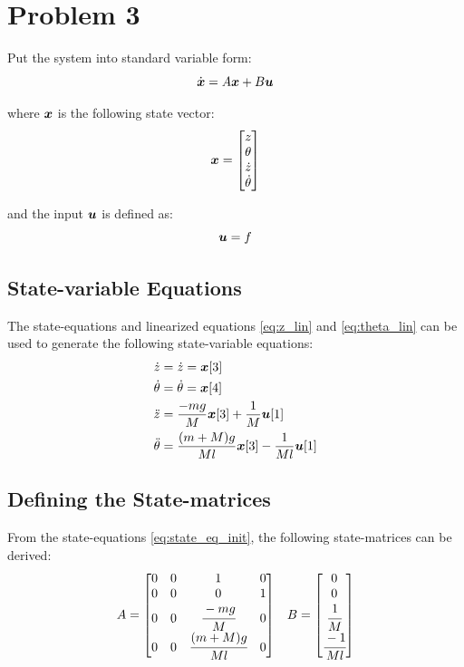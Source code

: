 \documentclass[]{article}
\begin{document}
\newpage	
\section{Problem 3}
	Put the system into standard variable form:
	\begin{equation}
		\dot{\vb*{x}} = A \vb*{x} + B \vb*{u} \label{eq:state_eq_def}
	\end{equation}
	
	where $\vb*{x}$ is the following state vector:
	\begin{equation}
		\vb*{x} = \mqty[z \\ \theta \\ \dot{z} \\ \dot{\theta}] \label{eq:state_var}
	\end{equation}
	
	and the input $\vb*{u}$ is defined as:
	\begin{equation}
		\vb*{u} = f
	\end{equation}
	
	\subsection{State-variable Equations}
	The state-equations and  linearized equations \eqref{eq:z_lin} and \eqref{eq:theta_lin} can be used to generate the following state-variable equations:
	\begin{equation}
		\begin{aligned}
			\dot{z} &= \dot{z} = \vb*{x}[3]\\
			\dot{\theta} & = \dot{\theta} = \vb*{x}[4]\\
			\ddot{z} & = \frac{-mg}{M}\vb*{x}[3] + \frac{1}{M} \vb*{u}[1]\\
			\ddot{\theta} & = \frac{(m+M)g}{Ml}\vb*{x}[3] - \frac{1}{Ml} \vb*{u}[1]
		\end{aligned}
		\label{eq:state_eq_init}
	\end{equation}
	
	\subsection{Defining the State-matrices}
	From the state-equations \eqref{eq:state_eq_init}, the following state-matrices can be derived:
	\begin{equation}
		\begin{aligned}
			&A = \mqty[	0 & 0 & 1 					& 0\\
						0 & 0 & 0 					& 1\\
						0 & 0 & \cfrac{-mg}{M} 		& 0\\
						0 & 0 & \cfrac{(m+M)g}{Ml}	& 0]
			&B = \mqty[	0\\
						0\\
						\cfrac{1}{M}\\
						\cfrac{-1}{Ml}]
		\end{aligned}
		\label{eq:state_matrices}
	\end{equation}
\end{document}
